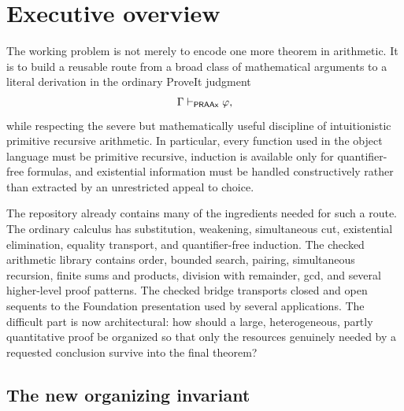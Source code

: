 \section{Executive overview}
\label{sec:executive}

The working problem is not merely to encode one more theorem in arithmetic.
It is to build a reusable route from a broad class of mathematical arguments
to a literal derivation in the ordinary ProveIt judgment
\[
  \Gamma \vdash_{\mathsf{PRAAx}} \varphi,
\]
while respecting the severe but mathematically useful discipline of
intuitionistic primitive recursive arithmetic.  In particular, every function
used in the object language must be primitive recursive, induction is
available only for quantifier-free formulas, and existential information must
be handled constructively rather than extracted by an unrestricted appeal to
choice.

The repository already contains many of the ingredients needed for such a
route.  The ordinary calculus has substitution, weakening, simultaneous cut,
existential elimination, equality transport, and quantifier-free induction.
The checked arithmetic library contains order, bounded search, pairing,
simultaneous recursion, finite sums and products, division with remainder,
gcd, and several higher-level proof patterns.  The checked bridge transports
closed and open sequents to the Foundation presentation used by several
applications.  The difficult part is now architectural: how should a large,
heterogeneous, partly quantitative proof be organized so that only the
resources genuinely needed by a requested conclusion survive into the final
theorem?

\subsection{The new organizing invariant}


